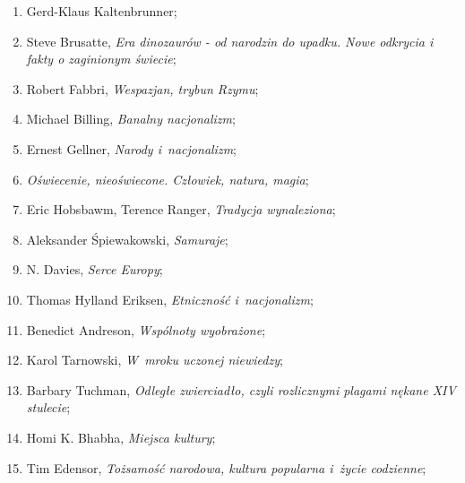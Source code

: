 \documentclass[a4paper,11pt]{article}
\begin{document}
\begin{enumerate}
\item Gerd-Klaus Kaltenbrunner;



\item Steve Brusatte, \textit{Era dinozaurów - od narodzin do upadku.
    Nowe odkrycia i fakty o zaginionym świecie};



\item Robert Fabbri, \textit{Wespazjan, trybun Rzymu};



\item Michael Billing, \textit{Banalny nacjonalizm};



\item Ernest Gellner, \textit{Narody i~nacjonalizm};



\item \textit{Oświecenie, nieoświecone. Człowiek, natura, magia};



\item Eric Hobsbawm, Terence Ranger, \textit{Tradycja wynaleziona};



\item Aleksander Śpiewakowski, \textit{Samuraje};



\item N. Davies, \textit{Serce Europy};



\item Thomas Hylland Eriksen, \textit{Etniczność i~nacjonalizm};



\item Benedict Andreson, \textit{Wspólnoty wyobrażone};



\item Karol Tarnowski, \textit{W~mroku uczonej niewiedzy};



\item Barbary Tuchman, \textit{Odległe zwierciadło, czyli rozlicznymi
    plagami nękane XIV stulecie};



\item Homi K. Bhabha, \textit{Miejsca kultury};



\item Tim Edensor, \textit{Tożsamość narodowa, kultura popularna i~życie
    codzienne};




\end{enumerate}
\end{document}
